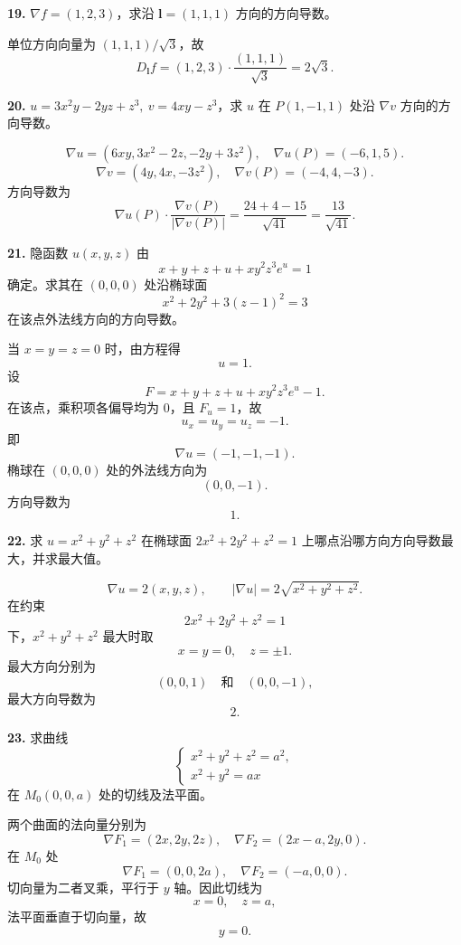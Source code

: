 \begin{problemblock}
\textbf{19.} \(\nabla f=(1,2,3)\)，求沿 \(\boldsymbol l=(1,1,1)\) 方向的方向导数。
\end{problemblock}
\begin{solutionblock}
单位方向向量为 \((1,1,1)/\sqrt3\)，故
\[
D_{\boldsymbol l}f=(1,2,3)\cdot\frac{(1,1,1)}{\sqrt3}
=\boxed{2\sqrt3}.
\]
\end{solutionblock}

\begin{problemblock}
\textbf{20.} \(u=3x^2y-2yz+z^3,\ v=4xy-z^3\)，求 \(u\) 在 \(P(1,-1,1)\) 处沿 \(\nabla v\) 方向的方向导数。
\end{problemblock}
\begin{solutionblock}
\[
\nabla u=(6xy,3x^2-2z,-2y+3z^2),
\quad
\nabla u(P)=(-6,1,5).
\]
\[
\nabla v=(4y,4x,-3z^2),
\quad
\nabla v(P)=(-4,4,-3).
\]
方向导数为
\[
\nabla u(P)\cdot\frac{\nabla v(P)}{|\nabla v(P)|}
=\frac{24+4-15}{\sqrt{41}}
=\boxed{\frac{13}{\sqrt{41}}}.
\]
\end{solutionblock}

\begin{problemblock}
\textbf{21.} 隐函数 \(u(x,y,z)\) 由
\[
x+y+z+u+xy^2z^3e^u=1
\]
确定。求其在 \((0,0,0)\) 处沿椭球面
\[
x^2+2y^2+3(z-1)^2=3
\]
在该点外法线方向的方向导数。
\end{problemblock}
\begin{solutionblock}
当 \(x=y=z=0\) 时，由方程得
\[
u=1.
\]
设
\[
F=x+y+z+u+xy^2z^3e^u-1.
\]
在该点，乘积项各偏导均为 \(0\)，且 \(F_u=1\)，故
\[
u_x=u_y=u_z=-1.
\]
即
\[
\nabla u=(-1,-1,-1).
\]
椭球在 \((0,0,0)\) 处的外法线方向为
\[
(0,0,-1).
\]
方向导数为
\[
\boxed{1}.
\]
\end{solutionblock}

\begin{problemblock}
\textbf{22.} 求 \(u=x^2+y^2+z^2\) 在椭球面 \(2x^2+2y^2+z^2=1\) 上哪点沿哪方向方向导数最大，并求最大值。
\end{problemblock}
\begin{solutionblock}
\[
\nabla u=2(x,y,z),\qquad |\nabla u|=2\sqrt{x^2+y^2+z^2}.
\]
在约束
\[
2x^2+2y^2+z^2=1
\]
下，\(x^2+y^2+z^2\) 最大时取
\[
x=y=0,\quad z=\pm1.
\]
最大方向分别为
\[
(0,0,1)\quad\text{和}\quad(0,0,-1),
\]
最大方向导数为
\[
\boxed{2}.
\]
\end{solutionblock}

\begin{problemblock}
\textbf{23.} 求曲线
\[
\begin{cases}
x^2+y^2+z^2=a^2,\\
x^2+y^2=ax
\end{cases}
\]
在 \(M_0(0,0,a)\) 处的切线及法平面。
\end{problemblock}
\begin{solutionblock}
两个曲面的法向量分别为
\[
\nabla F_1=(2x,2y,2z),\quad \nabla F_2=(2x-a,2y,0).
\]
在 \(M_0\) 处
\[
\nabla F_1=(0,0,2a),\quad \nabla F_2=(-a,0,0).
\]
切向量为二者叉乘，平行于 \(y\) 轴。因此切线为
\[
\boxed{x=0,\quad z=a},
\]
法平面垂直于切向量，故
\[
\boxed{y=0}.
\]
\end{solutionblock}

